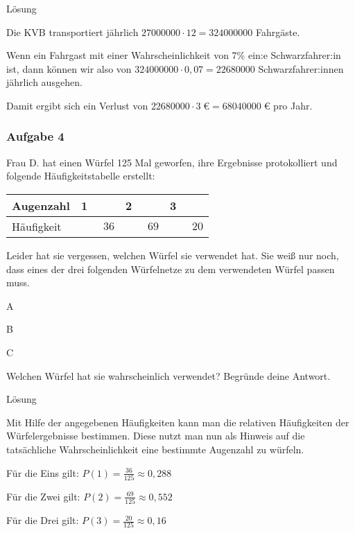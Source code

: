 \documentclass[
  ngerman,
]{book}
\begin{document}
Lösung

Die KVB transportiert jährlich \(27000000 \cdot 12 = 324000000\) Fahrgäste.

Wenn ein Fahrgast mit einer Wahrscheinlichkeit von 7\% ein:e Schwarzfahrer:in ist, dann können wir also von \(324000000 \cdot 0,07 = 22680000\) Schwarzfahrer:innen jährlich ausgehen.

Damit ergibt sich ein Verlust von \(22680000 \cdot 3\;€ = 68040000\;€\) pro Jahr.

\hypertarget{section-81}{%
\subsubsection*{}\label{section-81}}

\hypertarget{aufgabe-4}{%
\subsubsection*{Aufgabe 4}\label{aufgabe-4}}

Frau D. hat einen Würfel 125 Mal geworfen, ihre Ergebnisse protokolliert und folgende Häufigkeitstabelle erstellt:

\begin{longtable}[]{@{}llll@{}}
\toprule
Augenzahl & 1 & 2 & 3\tabularnewline
\midrule
\endhead
Häufigkeit & \(\quad\quad 36\) & \(\quad\quad 69\) & \(\quad\quad 20\)\tabularnewline
\bottomrule
\end{longtable}

Leider hat sie vergessen, welchen Würfel sie verwendet hat. Sie weiß nur noch, dass eines der drei folgenden Würfelnetze zu dem verwendeten Würfel passen muss.

A

B

C

Welchen Würfel hat sie wahrscheinlich verwendet? Begründe deine Antwort.

Lösung

Mit Hilfe der angegebenen Häufigkeiten kann man die relativen Häufigkeiten der Würfelergebnisse bestimmen. Diese nutzt man nun als Hinweis auf die tatsächliche Wahrscheinlichkeit eine bestimmte Augenzahl zu würfeln.

Für die Eins gilt: \(P(1)=\frac{36}{125} \approx 0,288\)

Für die Zwei gilt: \(P(2)=\frac{69}{125} \approx 0,552\)

Für die Drei gilt: \(P(3)=\frac{20}{125} \approx 0,16\)
\end{document}
